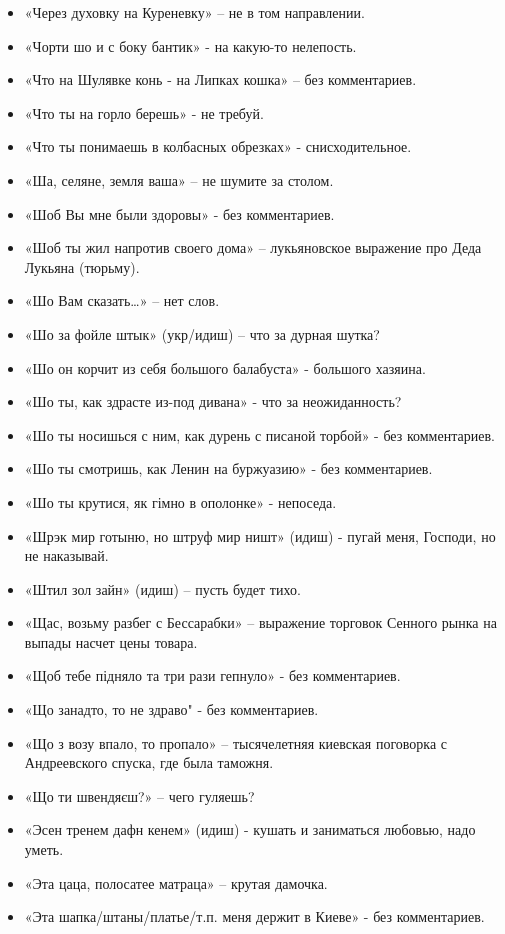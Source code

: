 \begin{itemize}
\item  «Через духовку на Куреневку» – не в том направлении.
\item  «Чорти шо и с боку бантик» - на какую-то нелепость.
\item  «Что на Шулявке конь - на Липках кошка» – без комментариев.
\item  «Что ты на горло берешь» - не требуй.
\item  «Что ты понимаешь в колбасных обрезках» - снисходительное.
\item  «Ша, селяне, земля ваша» – не шумите за столом.
\item  «Шоб Вы мне были здоровы» - без комментариев.
\item  «Шоб ты жил напротив своего дома» – лукьяновское выражение про Деда Лукьяна (тюрьму).
\item  «Шо Вам сказать…» – нет слов.
\item  «Шо за фойле штык» (укр/идиш) – что за дурная шутка?
\item  «Шо он корчит из себя большого балабуста» - большого хазяина.
\item  «Шо ты, как здрасте из-под дивана» - что за неожиданность?
\item  «Шо ты носишься с ним, как дурень с писаной торбой» - без комментариев.
\item  «Шо ты смотришь, как Ленин на буржуазию» - без комментариев.
\item  «Шо ты крутися, як гімно в ополонке» - непоседа.
\item  «Шрэк мир готыню, но штруф мир ништ» (идиш) - пугай меня, Господи, но не наказывай.
\item  «Штил зол зайн» (идиш) – пусть будет тихо.
\item  «Щас, возьму разбег с Бессарабки» – выражение торговок Сенного рынка на выпады насчет цены товара.
\item  «Щоб тебе підняло та три рази гепнуло» - без комментариев.
\item  «Що занадто, то не здраво" - без комментариев.
\item  «Що з возу впало, то пропало» – тысячелетняя киевская поговорка с Андреевского спуска, где была таможня.
\item  «Що ти швендяєш?» – чего гуляешь?
\item  «Эсен тренем дафн кенем» (идиш) - кушать и заниматься любовью, надо уметь.
\item  «Эта цаца, полосатее матраца» – крутая дамочка.
\item  «Эта шапка/штаны/платье/т.п. меня держит в Киеве» - без комментариев.

\end{itemize}
